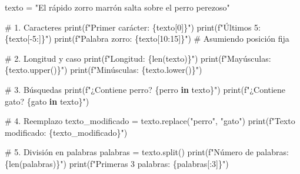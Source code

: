 \documentclass[
  doc,
  floatsintext,
  longtable,
  a4paper,
  nolmodern,
  notxfonts,
  notimes,
  12pt,
  colorlinks=true,linkcolor=blue,citecolor=blue,urlcolor=blue]{apa7}
\newenvironment{Shaded}{\begin{snugshade}}{\end{snugshade}}
\newcommand{\BuiltInTok}[1]{\textcolor[rgb]{0.00,0.23,0.31}{#1}}
\newcommand{\CommentTok}[1]{\textcolor[rgb]{0.37,0.37,0.37}{#1}}
\newcommand{\DecValTok}[1]{\textcolor[rgb]{0.68,0.00,0.00}{#1}}
\newcommand{\KeywordTok}[1]{\textcolor[rgb]{0.00,0.23,0.31}{\textbf{#1}}}
\newcommand{\NormalTok}[1]{\textcolor[rgb]{0.00,0.23,0.31}{#1}}
\newcommand{\OperatorTok}[1]{\textcolor[rgb]{0.37,0.37,0.37}{#1}}
\newcommand{\SpecialCharTok}[1]{\textcolor[rgb]{0.37,0.37,0.37}{#1}}
\newcommand{\SpecialStringTok}[1]{\textcolor[rgb]{0.13,0.47,0.30}{#1}}
\newcommand{\StringTok}[1]{\textcolor[rgb]{0.13,0.47,0.30}{#1}}
\begin{document}
\begin{Shaded}
\begin{Highlighting}[]
\NormalTok{texto }\OperatorTok{=} \StringTok{"El rápido zorro marrón salta sobre el perro perezoso"}

\CommentTok{\# 1. Caracteres}
\BuiltInTok{print}\NormalTok{(}\SpecialStringTok{f"Primer carácter: }\SpecialCharTok{\{}\NormalTok{texto[}\DecValTok{0}\NormalTok{]}\SpecialCharTok{\}}\SpecialStringTok{"}\NormalTok{)}
\BuiltInTok{print}\NormalTok{(}\SpecialStringTok{f"Últimos 5: }\SpecialCharTok{\{}\NormalTok{texto[}\OperatorTok{{-}}\DecValTok{5}\NormalTok{:]}\SpecialCharTok{\}}\SpecialStringTok{"}\NormalTok{)}
\BuiltInTok{print}\NormalTok{(}\SpecialStringTok{f"Palabra \textquotesingle{}zorro\textquotesingle{}: }\SpecialCharTok{\{}\NormalTok{texto[}\DecValTok{10}\NormalTok{:}\DecValTok{15}\NormalTok{]}\SpecialCharTok{\}}\SpecialStringTok{"}\NormalTok{)  }\CommentTok{\# Asumiendo posición fija}

\CommentTok{\# 2. Longitud y caso}
\BuiltInTok{print}\NormalTok{(}\SpecialStringTok{f"Longitud: }\SpecialCharTok{\{}\BuiltInTok{len}\NormalTok{(texto)}\SpecialCharTok{\}}\SpecialStringTok{"}\NormalTok{)}
\BuiltInTok{print}\NormalTok{(}\SpecialStringTok{f"Mayúsculas: }\SpecialCharTok{\{}\NormalTok{texto}\SpecialCharTok{.}\NormalTok{upper()}\SpecialCharTok{\}}\SpecialStringTok{"}\NormalTok{)}
\BuiltInTok{print}\NormalTok{(}\SpecialStringTok{f"Minúsculas: }\SpecialCharTok{\{}\NormalTok{texto}\SpecialCharTok{.}\NormalTok{lower()}\SpecialCharTok{\}}\SpecialStringTok{"}\NormalTok{)}

\CommentTok{\# 3. Búsquedas}
\BuiltInTok{print}\NormalTok{(}\SpecialStringTok{f"¿Contiene \textquotesingle{}perro\textquotesingle{}? }\SpecialCharTok{\{}\StringTok{\textquotesingle{}perro\textquotesingle{}} \KeywordTok{in}\NormalTok{ texto}\SpecialCharTok{\}}\SpecialStringTok{"}\NormalTok{)}
\BuiltInTok{print}\NormalTok{(}\SpecialStringTok{f"¿Contiene \textquotesingle{}gato\textquotesingle{}? }\SpecialCharTok{\{}\StringTok{\textquotesingle{}gato\textquotesingle{}} \KeywordTok{in}\NormalTok{ texto}\SpecialCharTok{\}}\SpecialStringTok{"}\NormalTok{)}

\CommentTok{\# 4. Reemplazo}
\NormalTok{texto\_modificado }\OperatorTok{=}\NormalTok{ texto.replace(}\StringTok{"perro"}\NormalTok{, }\StringTok{"gato"}\NormalTok{)}
\BuiltInTok{print}\NormalTok{(}\SpecialStringTok{f"Texto modificado: }\SpecialCharTok{\{}\NormalTok{texto\_modificado}\SpecialCharTok{\}}\SpecialStringTok{"}\NormalTok{)}

\CommentTok{\# 5. División en palabras}
\NormalTok{palabras }\OperatorTok{=}\NormalTok{ texto.split()}
\BuiltInTok{print}\NormalTok{(}\SpecialStringTok{f"Número de palabras: }\SpecialCharTok{\{}\BuiltInTok{len}\NormalTok{(palabras)}\SpecialCharTok{\}}\SpecialStringTok{"}\NormalTok{)}
\BuiltInTok{print}\NormalTok{(}\SpecialStringTok{f"Primeras 3 palabras: }\SpecialCharTok{\{}\NormalTok{palabras[:}\DecValTok{3}\NormalTok{]}\SpecialCharTok{\}}\SpecialStringTok{"}\NormalTok{)}
\end{Highlighting}
\end{Shaded}
\end{document}
